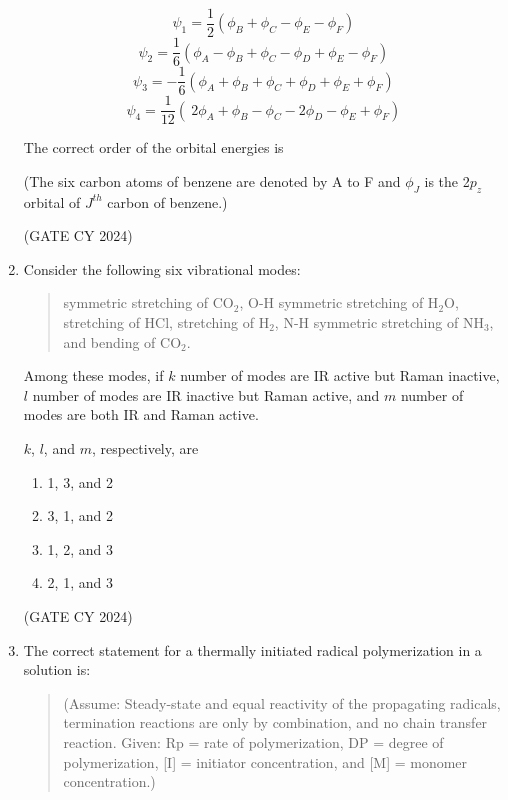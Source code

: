 \documentclass[12pt]{article}
\begin{document}
\begin{enumerate}
\[
\psi_1 = \frac{1}{2} (\phi_B + \phi_C - \phi_E - \phi_F)
\]
\[
\psi_2 = \frac{1}{6} (\phi_A - \phi_B + \phi_C - \phi_D + \phi_E - \phi_F)
\]
\[
\psi_3 = -\frac{1}{6} (\phi_A + \phi_B + \phi_C + \phi_D + \phi_E + \phi_F)
\]
\[
\psi_4 = \frac{1}{12} (\ 2\phi_A + \phi_B - \phi_C - 2\phi_D - \phi_E + \phi_F )
\]

The correct order of the orbital energies is

(The six carbon atoms of benzene are denoted by A to F and $\phi_J$ is the 2$p_z$ orbital of $J^{th}$ carbon of benzene.)

\begin{enumerate}
\end{enumerate}
\hfill (GATE CY 2024)

\item Consider the following six vibrational modes:

\begin{quote}
symmetric stretching of CO$_2$, O-H symmetric stretching of H$_2$O, stretching of HCl, stretching of H$_2$, N-H symmetric stretching of NH$_3$, and bending of CO$_2$.
\end{quote}

Among these modes, if $k$ number of modes are IR active but Raman inactive, $l$ number of modes are IR inactive but Raman active, and $m$ number of modes are both IR and Raman active.

$k$, $l$, and $m$, respectively, are
\begin{multicols}{2}
\begin{enumerate}
\item 1, 3, and 2
\item 3, 1, and 2
\item 1, 2, and 3
\item 2, 1, and 3
\end{enumerate}
\end{multicols}
\hfill (GATE CY 2024)

\item The correct statement for a thermally initiated radical polymerization in a solution is:

\begin{quote}
(Assume: Steady-state and equal reactivity of the propagating radicals, termination reactions are only by combination, and no chain transfer reaction.
Given: Rp = rate of polymerization, DP = degree of polymerization, [I] = initiator concentration, and [M] = monomer concentration.)
\end{quote}


\end{enumerate}
\end{document}
